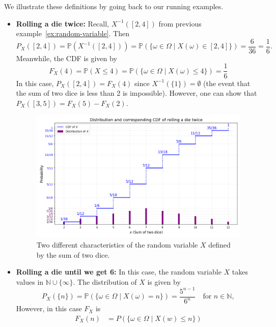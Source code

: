 \begin{example}
    We illustrate these definitions by going back to our running examples.
    \begin{itemize}
        \item \textbf{Rolling a die twice:} Recall, $X^{-1}([2, 4])$ from previous example~\ref{ex:random-variable}. Then
        \[
            P_X([2, 4]) = \mathbb{P}(X^{-1}([2, 4])) = \mathbb{P}(\{\omega \in \Omega \mid X(\omega) \in [2, 4]\}) = \frac{6}{36} = \frac{1}{6}.
        \]
        Meanwhile, the CDF is given by
        \[
            F_X(4) = \mathbb{P}(X \leq 4) = \mathbb{P}(\{\omega \in \Omega \mid X(\omega) \leq 4\}) = \frac{1}{6}
        \]
        In this case, $P_X([2, 4]) = F_X(4)$ since $X^{-1}(\{1\}) = \emptyset$ (the event that the sum of two dice is less than 2 is impossible). However, one can show that $P_X([3, 5]) = F_X(5) - F_X(2)$.
        \begin{figure}[h]
            \centering
            \includegraphics[scale=0.45]{chapter-1/sections/img}
            \caption{Two different characteristics of the random variable $X$ defined by the sum of two dice.\label{fig:figure-distribution-random-variable}}
        \end{figure}
        \item \textbf{Rolling a die until we get 6:} In this case, the random variable $X$ takes values in $\mathbb{N} \cup \{\infty\}$. The distribution of $X$ is given by
        \[
            P_X(\{n\})  = \mathbb{P}(\{\omega \in \Omega \mid X(\omega) = n\}) = \frac{5^{n-1}}{6^n} \quad \text{for } n \in \mathbb{N},
        \]
        However, in this case $F_X$ is
        \[
            \begin{aligned}
                F_X(n) &= P(\{\omega \in \Omega \mid  X(w) \leq n \}) \\

\end{aligned}\]
\end{itemize}
\end{example}
